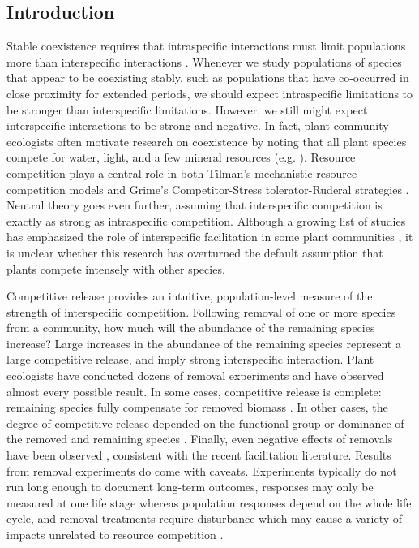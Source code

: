 \documentclass[11pt]{article}
\begin{document}
\begin{doublespacing}
\section*{Introduction}

Stable coexistence requires that intraspecific interactions must limit populations more than interspecific interactions \citep{chesson_mechanisms_2000}.  Whenever we study populations of species that appear to be coexisting stably, such as populations that have co-occurred in close proximity for extended periods, we should expect intraspecific limitations to be stronger than interspecific limitations. However, we still might expect interspecific interactions to be strong and negative. In fact, plant community ecologists often motivate research on coexistence by noting that all plant species compete for water, light, and a few mineral resources (e.g. \citealt{silvertown_plant_2004}). Resource competition plays a central role in both Tilman's mechanistic resource competition models \citep{tilman_resource_1982} and Grime's Competitor-Stress tolerator-Ruderal strategies \citep{grime_plant_1979}. Neutral theory \citep{hubbell_unified_2001} goes even further, assuming that interspecific competition is exactly as strong as intraspecific competition. Although a growing list of studies has emphasized the role of interspecific facilitation in some plant communities \citep{he_global_2013,brooker_facilitation_2008}, it is unclear whether this research has overturned the default assumption that plants compete intensely with other species.

Competitive release provides an intuitive, population-level measure of the strength of interspecific competition. Following removal of one or more species from a community, how much will the abundance of the remaining species increase? Large increases in the abundance of the remaining species represent a large competitive release, and imply strong interspecific interaction. Plant ecologists have conducted dozens of removal experiments and have observed almost every possible result. In some cases, competitive release is complete: remaining species fully compensate for removed biomass \citep{leps_nutrient_1999,jutila_effects_2002}. In other cases, the degree of competitive release depended on the functional group or dominance of the removed and remaining species \citep{smith_dominant_2003,sala_resource_1989,belsky_effects_1992}. Finally, even negative effects of removals have been observed \citep{keddy_effects_1989,gilbert_dominant_2009}, consistent with the recent facilitation literature. Results from removal experiments do come with caveats. Experiments typically do not run long enough to document long-term outcomes, responses may only be measured at one life stage whereas population responses depend on the whole life cycle, and removal treatments require disturbance which may cause a variety of impacts unrelated to resource competition \citep{aarssen_neighbour_1990}.


\end{doublespacing}
\end{document}
